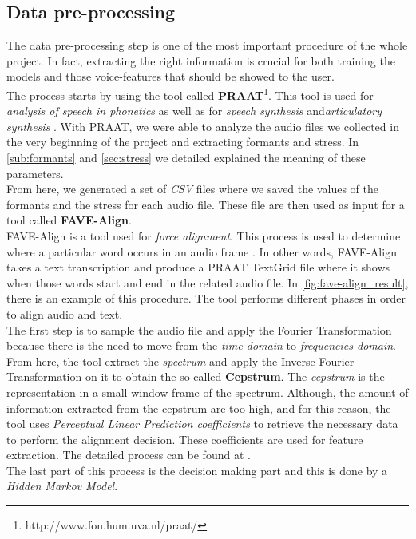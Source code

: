 \subsection{Data pre-processing}
\label{ssec:pre_processing}

The data pre-processing step is one of the most important procedure of the whole project. In fact, extracting the right information is crucial for both training the models and those voice-features that should be showed to the user. \\

\noindent The process starts by using the tool called \textbf{PRAAT}\footnote{http://www.fon.hum.uva.nl/praat/}. This tool is used for \textit{analysis of speech in phonetics} as well as for \textit{speech synthesis} and\textit{articulatory synthesis} \cite{boersma2001praat}. With PRAAT, we were able to analyze the audio files we collected in the very beginning of the project and extracting formants and stress. In \ref{sub:formants} and \ref{sec:stress} we detailed explained the meaning of these parameters. \\
From here, we generated a set of \textit{CSV} files where we saved the values of the formants and the stress for each audio file. These file are then used as input for a tool called \textbf{FAVE-Align}\cite{yuan2008speaker}. \\

\noindent FAVE-Align is a tool used for \textit{force alignment}. This process is used to determine where a particular word occurs in an audio frame \cite{forced_alignment_def}. In other words, FAVE-Align takes a text transcription and produce a PRAAT TextGrid file where it shows when those words start and end in the related audio file. In \ref{fig:fave-align_result}, there is an example of this procedure. The tool performs different phases in order to align audio and text.\\

\noindent The first step is to sample the audio file and apply the Fourier Transformation because there is the need to move from the \textit{time domain} to \textit{frequencies domain}. From here, the tool extract the \textit{spectrum} and apply the Inverse Fourier Transformation on it to obtain the so called \textbf{Cepstrum}. The \textit{cepstrum} is the representation in a small-window frame of the spectrum. Although, the amount of information extracted from the cepstrum are too high, and for this reason, the tool uses \textit{Perceptual Linear Prediction coefficients} to retrieve the necessary data to perform the alignment decision. These coefficients are used for feature extraction. The detailed process can be found at \cite{hermansky1990perceptual}. \\
The last part of this process is the decision making part and this is done by a \textit{Hidden Markov Model}. \\ 

